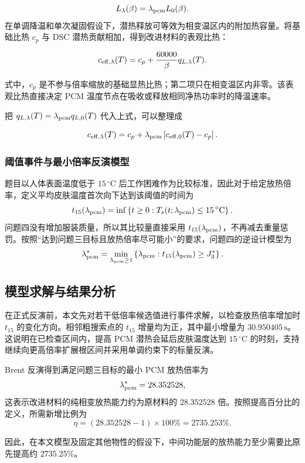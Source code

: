 \documentclass[withoutpreface,bwprint]{cumcmthesis}
\begin{document}
\begin{equation}
L_{\lambda}(\beta)=\lambda_{\rm pcm}L_0(\beta).
\end{equation}
在单调降温和单次凝固假设下，潜热释放可等效为相变温区内的附加热容量。将基础比热 $c_p$ 与 DSC 潜热贡献相加，得到改进材料的表观比热：

$$
c_{\rm eff,\lambda}(T)=c_p+\frac{60000}{\beta}q_{L,\lambda}(T).
$$

式中，$c_p$ 是不参与倍率缩放的基础显热比热；第二项只在相变温区内非零。该表观比热直接决定 PCM 温度节点在吸收或释放相同净热功率时的降温速率。

把 $q_{L,\lambda}(T)=\lambda_{\rm pcm}q_{L,0}(T)$ 代入上式，可以整理成

\begin{equation}
c_{\rm eff,\lambda}(T)=c_p+\lambda_{\rm pcm}\left[c_{\rm eff,0}(T)-c_p\right].
\end{equation}

\subsubsection{阈值事件与最小倍率反演模型}
题目以人体表面温度低于 $15\,{}^\circ\mathrm C$ 后工作困难作为比较标准，因此对于给定放热倍率，定义平均皮肤温度首次向下达到该阈值的时间为
$$
t_{15}(\lambda_{\rm pcm})=\inf\left\{t\ge0:T_s(t;\lambda_{\rm pcm})\le15\,{}^\circ\mathrm C\right\}.
$$
问题四没有增加服装质量，所以其比较量直接采用 $t_{15}(\lambda_{\rm pcm})$，不再减去重量惩罚。按照“达到问题三目标且放热倍率尽可能小”的要求，问题四的逆设计模型为
$$
\lambda_{\rm pcm}^*=\min_{\lambda_{\rm pcm}\ge1}\left\{\lambda_{\rm pcm}:t_{15}(\lambda_{\rm pcm})\ge J_3^*\right\}.
$$

\subsection{模型求解与结果分析}
在正式反演前，本文先对若干低倍率候选值进行事件求解，以检查放热倍率增加时 $t_{15}$ 的变化方向。相邻粗搜索点的 $t_{15}$ 增量均为正，其中最小增量为 $30.950405\,\mathrm s$。这说明在已检查区间内，提高 PCM 潜热会延后皮肤温度达到 $15\,{}^\circ\mathrm C$ 的时刻，支持继续向更高倍率扩展根区间并采用单调约束下的标量反演。

Brent 反演得到满足问题三目标的最小 PCM 放热倍率为
$$
\lambda_{\rm pcm}^*=28.352528,
$$
这表示改进材料的纯相变放热能力约为原材料的 $28.352528$ 倍。按照提高百分比的定义，所需新增比例为
$$
\eta=(28.352528-1)\times100\%=2735.253\%.
$$

因此，在本文模型及固定其他物性的假设下，中间功能层的放热能力至少需要比原先提高约 $2735.25\%$。
\end{document}
